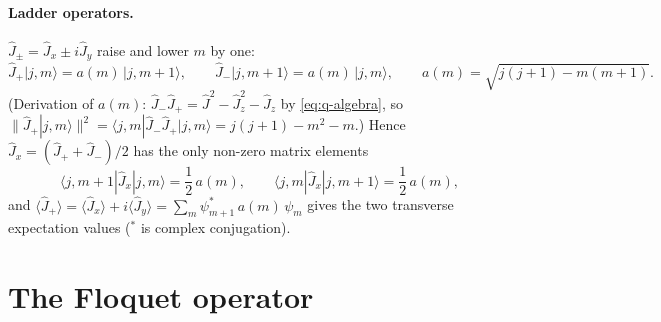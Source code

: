 \documentclass[11pt,a4paper]{article}
\begin{document}
\paragraph{Ladder operators.} $\hat J_\pm = \hat J_x \pm i\hat J_y$ raise and lower $m$ by one:
\begin{equation}\label{eq:ladder}
  \hat J_+|j,m\rangle = a(m)\,|j,m+1\rangle, \qquad \hat J_-|j,m+1\rangle = a(m)\,|j,m\rangle, \qquad
  a(m) = \sqrt{j(j+1) - m(m+1)} .
\end{equation}
(Derivation of $a(m)$: $\hat J_-\hat J_+ = \hat J^2 - \hat J_z^2 - \hat J_z$ by \eqref{eq:q-algebra}, so
$\|\hat J_+|j,m\rangle\|^2 = \langle j,m|\hat J_-\hat J_+|j,m\rangle = j(j+1) - m^2 - m$.) Hence $\hat J_x = (\hat J_+ +
\hat J_-)/2$ has the only non-zero matrix elements
\begin{equation}\label{eq:jx-elements}
  \langle j,m+1|\hat J_x|j,m\rangle = \frac{1}{2}\,a(m), \qquad \langle j,m|\hat J_x|j,m+1\rangle = \frac{1}{2}\,a(m),
\end{equation}
and $\langle\hat J_+\rangle = \langle\hat J_x\rangle + i\langle\hat J_y\rangle = \sum_m \psi_{m+1}^*\,a(m)\,\psi_m$
gives the two transverse expectation values ($^*$ is complex conjugation).

\section{The Floquet operator}\label{sec:floquet}
\end{document}
